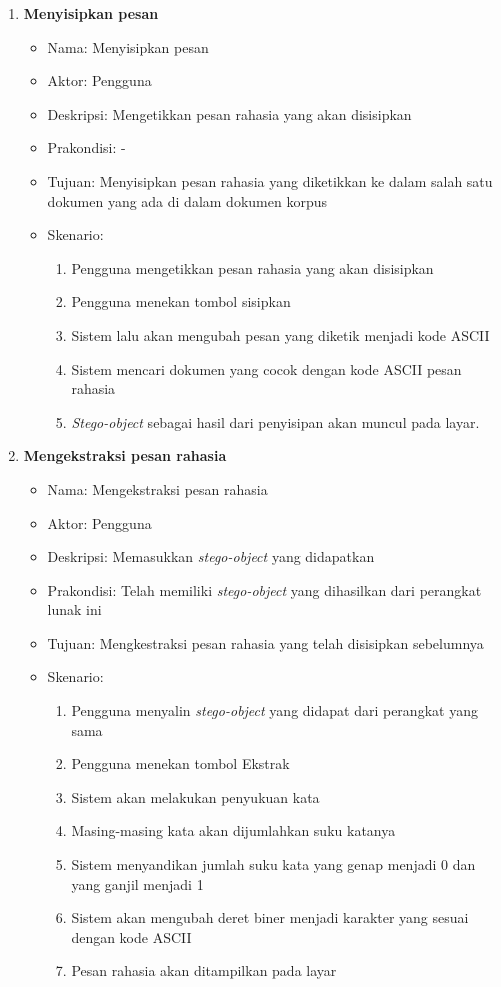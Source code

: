 \begin{enumerate}
	\item \textbf{Menyisipkan pesan}
	\begin{itemize}
		\item Nama: Menyisipkan pesan
		\item Aktor: Pengguna
		\item Deskripsi: Mengetikkan pesan rahasia yang akan disisipkan		
		\item Prakondisi: -
		\item Tujuan: Menyisipkan pesan rahasia yang diketikkan ke dalam salah satu dokumen yang ada di dalam dokumen korpus
		\item Skenario:
			\begin{enumerate}
				\item Pengguna mengetikkan pesan rahasia yang akan disisipkan
				\item Pengguna menekan tombol sisipkan
				\item Sistem lalu akan mengubah pesan yang diketik menjadi kode ASCII
				\item Sistem mencari dokumen yang cocok dengan kode ASCII pesan rahasia
				\item \textit{Stego-object} sebagai hasil dari penyisipan akan muncul pada layar.
			\end{enumerate}
	\end{itemize}
	
	\item \textbf{Mengekstraksi pesan rahasia}
	\begin{itemize}
		\item Nama: Mengekstraksi pesan rahasia
		\item Aktor: Pengguna
		\item Deskripsi: Memasukkan \textit{stego-object} yang didapatkan
		\item Prakondisi: Telah memiliki \textit{stego-object} yang dihasilkan dari perangkat lunak ini
		\item Tujuan: Mengkestraksi pesan rahasia yang telah disisipkan sebelumnya
		\item Skenario:
			\begin{enumerate}
				\item Pengguna menyalin \textit{stego-object} yang didapat dari perangkat yang sama
				\item Pengguna menekan tombol Ekstrak
				\item Sistem akan melakukan penyukuan kata
				\item Masing-masing kata akan dijumlahkan suku katanya
				\item Sistem menyandikan jumlah suku kata yang genap menjadi 0 dan yang ganjil menjadi 1
				\item Sistem akan mengubah deret biner menjadi karakter yang sesuai dengan kode ASCII
				\item Pesan rahasia akan ditampilkan pada layar
			\end{enumerate}
	\end{itemize}
\end{enumerate}

